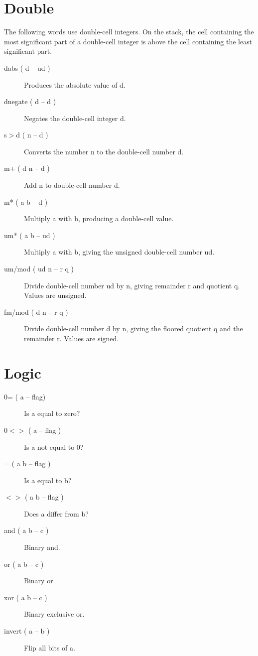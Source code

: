 \begin{description}
\end{description}

\section{Double}

The following words use double-cell integers. On the stack, the cell containing the most significant part of a double-cell integer is above the cell containing the least significant part.

\begin{description}
\item[dabs ( d -- ud )] Produces the absolute value of d.
\item[dnegate ( d -- d )] Negates the double-cell integer d.
\item[s$>$d ( n -- d )] Converts the number n to the double-cell number d.
\item[m+ ( d n -- d )] Add n to double-cell number d.
\item[m* ( a b -- d )] Multiply a with b, producing a double-cell value.
\item[um* ( a b -- ud )] Multiply a with b, giving the unsigned double-cell number ud.
\item[um/mod ( ud n -- r q )] Divide double-cell number ud by n, giving remainder r and quotient q. Values are unsigned.
\item[fm/mod ( d n -- r q )] Divide double-cell number d by n, giving the floored quotient q and the remainder r. Values are signed.
\end{description}

\section{Logic}

\begin{description}
\item[0= ( a -- flag)] Is a equal to zero?
\item[0$<>$ ( a -- flag )] Is a not equal to 0?
\item[\index{=}= ( a b -- flag )] Is a equal to b?
\item[\index{$<>$}$<>$ ( a b -- flag )] Does a differ from b?
\item[and ( a b -- c )] Binary and.
\item[or ( a b -- c )] Binary or.
\item[xor ( a b -- c )] Binary exclusive or.
\item[invert ( a -- b )] Flip all bits of a.
\end{description}

